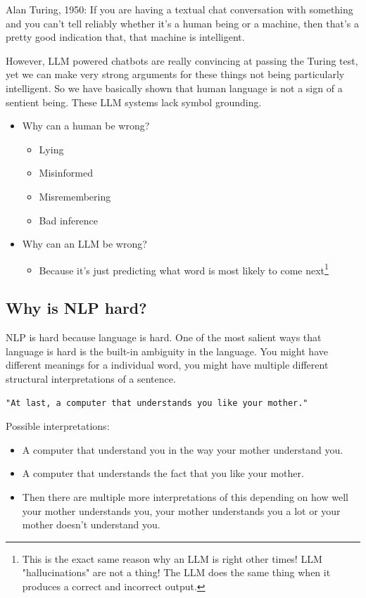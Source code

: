 \documentclass[11pt]{article}
\begin{document}
Alan Turing, 1950: If you are having a textual chat conversation with something and you can't tell reliably whether it's a human being or a machine, then that's a pretty good indication that, that machine is intelligent. 


However, LLM powered chatbots are really convincing at passing the Turing test, yet we can make very strong arguments for these things not being particularly intelligent. So we have basically shown that human language is not a sign of a sentient being. These LLM systems lack symbol grounding.




\begin{itemize}
  \item Why can a human be wrong?
  \begin{itemize}
    \item Lying
    \item Misinformed
    \item Misremembering
    \item Bad inference
  \end{itemize}

  \item Why can an LLM be wrong?
  \begin{itemize}
    \item Because it's just predicting what word is most likely to come next\footnote{This is the exact same reason why an LLM is right other times! LLM "hallucinations" are not a thing! The LLM does the same thing when it produces a correct and incorrect output.}
  \end{itemize}
\end{itemize}

\subsection*{Why is NLP hard?}
NLP is hard because language is hard. One of the most salient ways that language is hard is the built-in ambiguity in the language. You might have different meanings for a individual word, you might have multiple different structural interpretations of a sentence.

\begin{verbatim}
"At last, a computer that understands you like your mother."
\end{verbatim}
Possible interpretations:
\begin{itemize}
  \item A computer that understand you in the way your mother understand you.
  \item A computer that understands the fact that you like your mother.
  \item Then there are multiple more interpretations of this depending on how well your mother understands you, your mother understands you a lot or your mother doesn't understand you.
\end{itemize}
\end{document}
